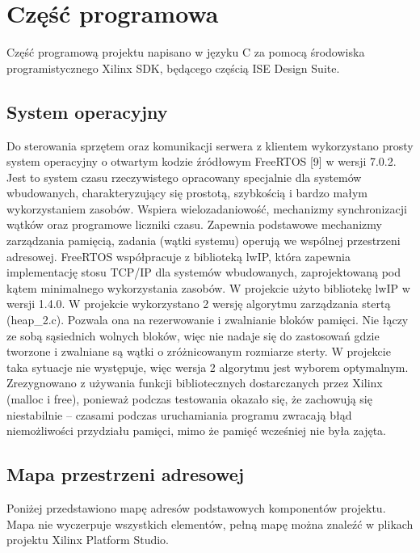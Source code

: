 \documentclass[a4paper,11pt,oneside]{book}  %
\begin{document}
\section{Część programowa}
Część programową projektu napisano w języku C za pomocą środowiska programistycznego Xilinx SDK, będącego częścią ISE Design Suite.

\subsection{System operacyjny} 

Do sterowania sprzętem oraz komunikacji serwera z klientem wykorzystano prosty system operacyjny o otwartym kodzie źródłowym FreeRTOS [9] w wersji 7.0.2. Jest to system czasu rzeczywistego opracowany specjalnie dla systemów wbudowanych, charakteryzujący się prostotą, szybkością i bardzo małym wykorzystaniem zasobów. Wspiera wielozadaniowość, mechanizmy synchronizacji wątków oraz programowe liczniki czasu. Zapewnia podstawowe mechanizmy zarządzania pamięcią, zadania (wątki systemu) operują we wspólnej przestrzeni adresowej. FreeRTOS współpracuje z biblioteką lwIP, która zapewnia implementację stosu TCP/IP dla systemów wbudowanych, zaprojektowaną pod kątem minimalnego wykorzystania zasobów. W projekcie użyto bibliotekę lwIP w wersji 1.4.0. W projekcie wykorzystano 2 wersję algorytmu zarządzania stertą (heap\_2.c). Pozwala ona na rezerwowanie i zwalnianie bloków pamięci. Nie łączy ze sobą sąsiednich wolnych bloków, więc nie nadaje się do zastosowań gdzie tworzone i zwalniane są wątki o zróżnicowanym rozmiarze sterty. W projekcie taka sytuacje nie występuje, więc wersja 2 algorytmu jest wyborem optymalnym. Zrezygnowano z używania funkcji bibliotecznych dostarczanych przez Xilinx (malloc i free), ponieważ podczas testowania okazało się, że zachowują się niestabilnie – czasami podczas uruchamiania programu zwracają błąd niemożliwości przydziału pamięci, mimo że pamięć wcześniej nie była zajęta.

\subsection{Mapa przestrzeni adresowej}
Poniżej przedstawiono mapę adresów podstawowych komponentów projektu. Mapa nie wyczerpuje wszystkich elementów, pełną mapę można znaleźć w plikach projektu Xilinx Platform Studio.
\end{document}
